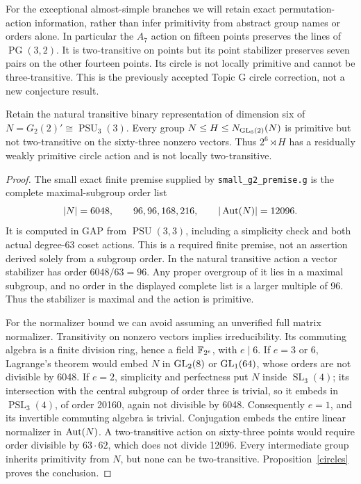 For the exceptional almost-simple branches we will retain exact
permutation-action information, rather than infer primitivity from
abstract group names or orders alone. In particular the $A_7$ action
on fifteen points preserves the lines of $\operatorname{PG}(3,2)$.
It is two-transitive on points but its point stabilizer preserves
seven pairs on the other fourteen points. Its circle is not locally
primitive and cannot be three-transitive. This is the previously
accepted Topic G circle correction, not a new conjecture result.

\begin{proposition}\label{binaryg2}
Retain the natural transitive binary representation of dimension six of
$N=G_2(2)'\cong\operatorname{PSU}_3(3)$. Every group
$N\le H\le N_{\operatorname{GL}_6(2)}(N)$ is primitive but not two-transitive on
the sixty-three nonzero vectors. Thus $2^6\rtimes H$ has a residually
weakly primitive circle action and is not locally two-transitive.
\end{proposition}
\begin{proof}
The small exact finite premise supplied by \texttt{small\_g2\_premise.g}
is the complete maximal-subgroup order list
\[
 |N|=6048,\qquad 96,96,168,216,\qquad |\operatorname{Aut}(N)|=12096.
\]
It is computed in GAP from $\operatorname{PSU}(3,3)$, including a
simplicity check and both actual degree-63 coset actions. This is a
required finite premise, not an assertion derived solely from a subgroup
order. In the natural transitive action a vector stabilizer has order
$6048/63=96$. Any proper overgroup of it lies in a maximal subgroup,
and no order in the displayed complete list is a larger multiple of
96. Thus the stabilizer is maximal and the action is primitive.

For the normalizer bound we can avoid assuming an unverified full
matrix normalizer. Transitivity on nonzero vectors implies irreducibility.
Its commuting algebra is a finite division ring, hence a field $\mathbb F_{2^e}$,
with $e\mid6$. If $e=3$ or $6$, Lagrange's theorem would embed $N$
in $\operatorname{GL}_2(8)$ or $\operatorname{GL}_1(64)$, whose orders are not divisible by
6048. If $e=2$, simplicity and perfectness put $N$ inside
$\operatorname{SL}_3(4)$; its intersection with the central subgroup of order three
is trivial, so it embeds in $\operatorname{PSL}_3(4)$, of order 20160, again not
divisible by 6048. Consequently $e=1$, and its invertible commuting
algebra is trivial. Conjugation embeds the entire linear normalizer
in $\operatorname{Aut}(N)$. A two-transitive action on sixty-three points would
require order divisible by $63\cdot62$, which does not divide 12096.
Every intermediate group inherits primitivity from $N$, but none
can be two-transitive. Proposition~\ref{circles} proves the conclusion.
\end{proof}

